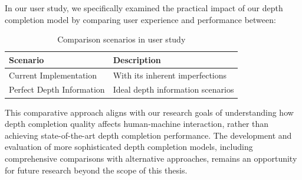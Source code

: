 In our user study, we specifically examined the practical impact of our depth completion model by comparing user experience and performance between:

\begin{table}[h]
\centering
\begin{tabular}{ll}
\hline
\textbf{Scenario} & \textbf{Description} \\
\hline
Current Implementation & With its inherent imperfections \\
Perfect Depth Information & Ideal depth information scenarios \\
\hline
\end{tabular}
\caption{Comparison scenarios in user study}
\label{tab:comparison_scenarios}
\end{table}

This comparative approach aligns with our research goals of understanding how depth completion quality affects human-machine interaction, rather than achieving state-of-the-art depth completion performance. The development and evaluation of more sophisticated depth completion models, including comprehensive comparisons with alternative approaches, remains an opportunity for future research beyond the scope of this thesis.

